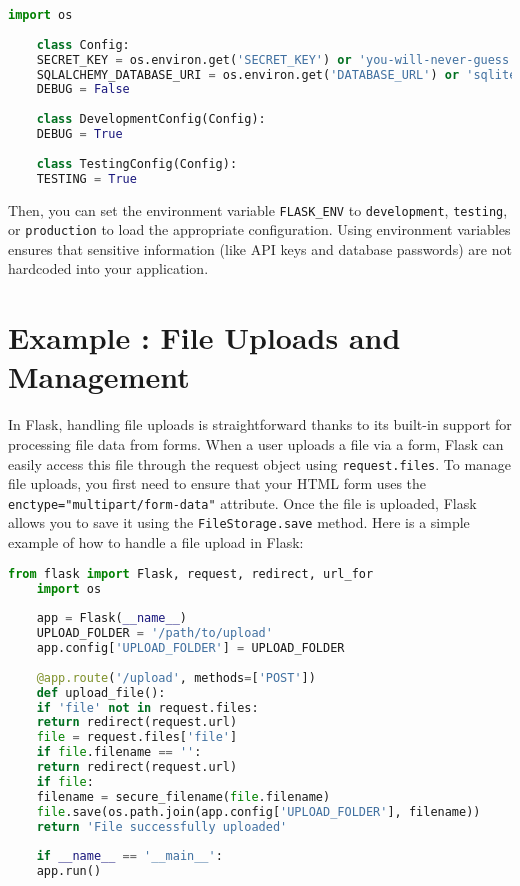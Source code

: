 \begin{lstlisting}[language=Python]
	import os
	
	class Config:
	SECRET_KEY = os.environ.get('SECRET_KEY') or 'you-will-never-guess'
	SQLALCHEMY_DATABASE_URI = os.environ.get('DATABASE_URL') or 'sqlite:///app.db'
	DEBUG = False
	
	class DevelopmentConfig(Config):
	DEBUG = True
	
	class TestingConfig(Config):
	TESTING = True
\end{lstlisting}

Then, you can set the environment variable \texttt{FLASK\_ENV} to \texttt{development}, \texttt{testing}, or \texttt{production} to load the appropriate configuration. Using environment variables ensures that sensitive information (like API keys and database passwords) are not hardcoded into your application.\cite{stouffermastering:2015}

\section{Example : File Uploads and Management}

In Flask, handling file uploads is straightforward thanks to its built-in support for processing file data from forms. When a user uploads a file via a form, Flask can easily access this file through the request object using \texttt{request.files}. To manage file uploads, you first need to ensure that your HTML form uses the \texttt{enctype="multipart/form-data"} attribute. Once the file is uploaded, Flask allows you to save it using the \texttt{FileStorage.save} method.\cite{Flaskdocs:2024} Here is a simple example of how to handle a file upload in Flask:

\begin{lstlisting}[language=Python]
	from flask import Flask, request, redirect, url_for
	import os
	
	app = Flask(__name__)
	UPLOAD_FOLDER = '/path/to/upload'
	app.config['UPLOAD_FOLDER'] = UPLOAD_FOLDER
	
	@app.route('/upload', methods=['POST'])
	def upload_file():
	if 'file' not in request.files:
	return redirect(request.url)
	file = request.files['file']
	if file.filename == '':
	return redirect(request.url)
	if file:
	filename = secure_filename(file.filename)
	file.save(os.path.join(app.config['UPLOAD_FOLDER'], filename))
	return 'File successfully uploaded'
	
	if __name__ == '__main__':
	app.run()
\end{lstlisting}

